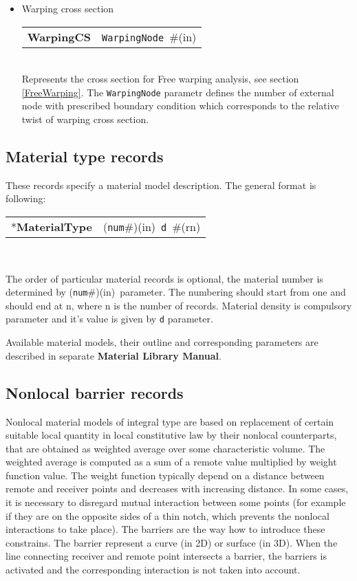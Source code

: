 \documentclass[a4paper]{article}
\newcommand{\param}[1]{\texttt{#1}} %
\newcommand{\field}[2]{\param{#1}~\#{\tiny(#2)}} %
\newcommand{\componentNum}{(\param{num}\#){\tiny(in)}} %
\newcommand{\entKeyword}[1]{*\textbf{#1}} %
\newcommand{\entKeywordInst}[1]{\textbf{#1}} %
\newenvironment{record}[1][]{\begin{tabular}{|ll}}{\end{tabular}\\}
\newcommand{\recentry}[2]{{#1}&{#2}\\}
\newcounter{rcc}
\newenvironment{record}[1][\textwidth]{\setcounter{rcc}{0}\rowcolors{1}{lightgray}{lightgray}\tabularx{#1}{llR} \hline}
               {\endtabularx}
\newcommand{\recentry}[2]{\ifthenelse{\value{rcc}>0}{$\backslash$ \\}{\setcounter{rcc}{1}}{#1}&{#2}&}
\begin{document}
\begin{itemize}
\item
Warping cross section \\
\begin{record}[0.9\textwidth]
\recentry{\entKeywordInst{WarpingCS}}{\field{WarpingNode}{in}}
\end{record}
Represents the cross section for Free warping analysis, see section \ref{FreeWarping}. The \param{WarpingNode} parametr defines the number of external node with prescribed boundary condition which corresponds to the relative twist of warping cross section.

\end{itemize}

\subsection{Material type  records}
\label{_MaterialTypeRecords}
These records specify a material model  description. The general format is
following:

\noindent
\begin{record}
  \recentry{\entKeyword{MaterialType}}{\componentNum\ \field{d}{rn}}
\end{record}

The order of particular material records is optional, the material number is determined by \componentNum\ parameter.
The numbering should start from one and should end at n, where n is the number of records.
Material density is compulsory parameter and it's value is given by
\param{d} parameter.

Available material models, their outline and
corresponding parameters are described in separate \textbf{Material Library Manual}.

\subsection{Nonlocal barrier records}
\label{_NonlocalBarrierRecords}
Nonlocal material models of integral type are based on replacement of
certain suitable local quantity in local constitutive law by their
nonlocal counterparts, that are obtained as weighted average over
some characteristic volume. The weighted average is computed as a sum
of a remote value multiplied by weight function value. The weight
function typically depend on a distance between remote and receiver
points and decreases with increasing distance. In some cases, it is
necessary to disregard mutual interaction between some points (for
example if they are on the opposite sides of a thin notch, which
prevents the nonlocal interactions to take place). The barriers are
the way how to introduce these constrains. The barrier represent a
curve (in 2D) or surface (in 3D). When the line connecting receiver and
remote point intersects a barrier, the barriers is activated and the
corresponding interaction is not taken into account.
\end{document}
